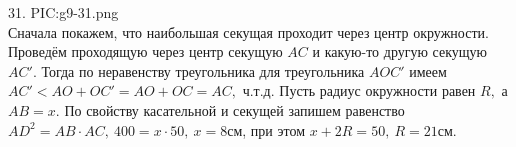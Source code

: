 31. {{PIC:g9-31.png}}\\
Сначала покажем, что наибольшая секущая проходит через центр окружности. Проведём проходящую через центр секущую $AC$ и какую-то другую секущую $AC'.$ Тогда по неравенству треугольника для треугольника $AOC'$ имеем $AC'<AO+OC'=AO+OC=AC,$ ч.т.д. Пусть радиус окружности равен $R,$ а $AB=x.$ По свойству касательной и секущей
запишем равенство $AD^2=AB\cdot AC,\ 400=x\cdot 50,\ x=8$см, при этом $x+2R=50,\ R=21$см.\\
